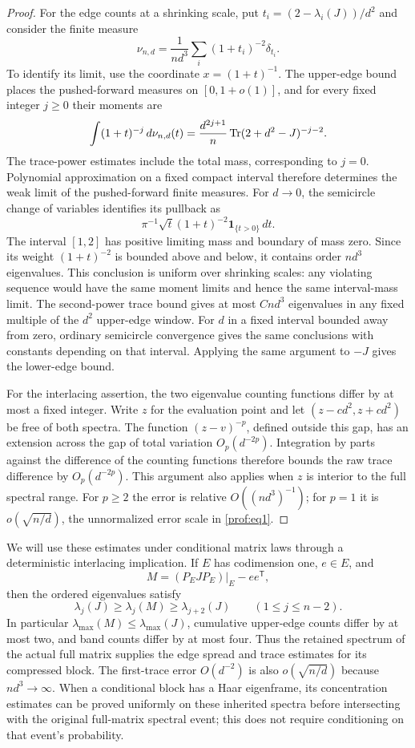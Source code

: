 \begin{proof}
For the edge counts at a shrinking scale, put
$t_i=(2-\lambda_i(J))/d^2$ and consider the finite measure
\[
 \nu_{n,d}=\frac1{nd^3}\sum_i(1+t_i)^{-2}\delta_{t_i}.
\]
To identify its limit, use the coordinate $x=(1+t)^{-1}$. The upper-edge
bound places the pushed-forward measures on $[0,1+o(1)]$, and for every
fixed integer $j\ge0$ their moments are
\[
 \int (1+t)^{-j}\,d\nu_{n,d}(t)
 =\frac{d^{2j+1}}n\operatorname{Tr}(2+d^2-J)^{-j-2}.
\]
The trace-power estimates include the total mass, corresponding to
$j=0$. Polynomial approximation on a fixed compact interval therefore
determines the weak limit of the pushed-forward finite measures. For
$d\to0$, the semicircle change of variables identifies its pullback as
\[
 \pi^{-1}\sqrt t(1+t)^{-2}\mathbf1_{\{t>0\}}\,dt.
\]
The interval $[1,2]$ has positive limiting mass and boundary of mass
zero. Since its weight $(1+t)^{-2}$ is bounded above and below, it
contains order $nd^3$ eigenvalues. This conclusion is uniform over
shrinking scales: any violating sequence would have the same moment
limits and hence the same interval-mass limit. The second-power trace bound
gives at most $Cnd^3$ eigenvalues in any fixed multiple of the
$d^2$ upper-edge window. For $d$ in a fixed interval bounded away
from zero, ordinary semicircle convergence gives the same conclusions
with constants depending on that interval. Applying the same
argument to $-J$ gives the lower-edge bound.

For the interlacing assertion, the two eigenvalue counting functions
differ by at most a fixed integer. Write $z$ for the evaluation point
and let $(z-cd^2,z+cd^2)$ be free of both spectra. The function
$(z-v)^{-p}$, defined outside this gap, has an extension across the
gap of total variation $O_p(d^{-2p})$. Integration by parts against
the difference of the counting functions therefore bounds the raw
trace difference by $O_p(d^{-2p})$. This argument also applies when
$z$ is interior to the full spectral range. For $p\ge2$ the error
is relative $O((nd^3)^{-1})$; for $p=1$ it is
$o(\sqrt{n/d})$, the unnormalized error scale in \eqref{prof:eq1}.
\end{proof}

We will use these estimates under conditional matrix laws through a
deterministic interlacing implication. If $E$ has codimension one,
$e\in E$, and
\[
 M=(P_EJP_E)|_E-ee^{\mathsf T},
\]
then the ordered eigenvalues satisfy
\[
 \lambda_j(J)\ge\lambda_j(M)\ge\lambda_{j+2}(J)
 \qquad(1\le j\le n-2).
\]
In particular $\lambda_{\max}(M)\le\lambda_{\max}(J)$, cumulative
upper-edge counts differ by at most two, and band counts differ by at
most four. Thus the retained spectrum of the actual full matrix supplies
the edge spread and trace estimates for its compressed block. The
first-trace error $O(d^{-2})$ is also $o(\sqrt{n/d})$ because
$nd^3\to\infty$. When a conditional block has a Haar eigenframe, its
concentration estimates can be proved uniformly on these inherited
spectra before intersecting with the original full-matrix spectral
event; this does not require conditioning on that event's probability.

